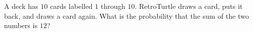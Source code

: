 A deck has $10$ cards labelled $1$ through $10$. RetroTurtle draws a card, puts it back, and draws a card again. What is the probability that the sum of the two numbers is $12$?
